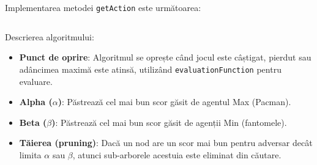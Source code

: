 \par Implementarea metodei \texttt{getAction} este următoarea:
\inputminted[linenos]{python}{code/alpha_beta_pruning.py}

\par Descrierea algoritmului:
\begin{itemize}
	\item \textbf{Punct de oprire}: Algoritmul se oprește când jocul este câștigat, pierdut sau adâncimea maximă este atinsă, utilizând \texttt{evaluationFunction} pentru evaluare.
	\item \textbf{Alpha (\( \alpha \))}: Păstrează cel mai bun scor găsit de agentul Max (Pacman).
	\item \textbf{Beta (\( \beta \))}: Păstrează cel mai bun scor găsit de agenții Min (fantomele).
	\item \textbf{Tăierea (pruning)}: Dacă un nod are un scor mai bun pentru adversar decât limita \( \alpha \) sau \( \beta \), atunci sub-arborele acestuia este eliminat din căutare.
\end{itemize}
